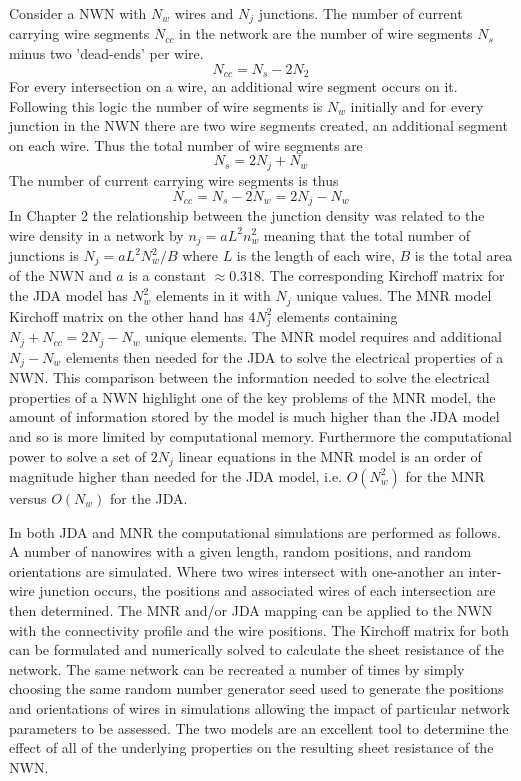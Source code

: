 Consider a NWN with $N_w$ wires and $N_j$ junctions. The number of current carrying wire segments $N_{cc}$ in the network are the number of wire segments $N_s$ minus two 'dead-ends' per wire.
\begin{equation}
N_{cc} = N_s - 2 N_2
\end{equation}
For every intersection on a wire, an additional wire segment occurs on it. Following this logic the number of wire segments is $N_w$ initially and for every junction in the NWN there are two wire segments created, an additional segment on each wire. Thus the total number of wire segments are 
\begin{equation}
N_s = 2N_j + N_w
\end{equation}
The number of current carrying wire segments is thus 
\begin{equation}
N_{cc} = N_s - 2 N_w = 2 N_j - N_w
\end{equation}
In Chapter 2 the relationship between the junction density was related to the wire density in a network by $n_j = a L^2 n_w^2 $ meaning that the total number of junctions is $N_j = a L^2 N_w^2 / B$ where $L$ is the length of each wire, $B$ is the total area of the NWN and $a$ is a constant $\approx 0.318$. The corresponding Kirchoff matrix for the JDA model has $N_w^2$ elements in it with $N_j$ unique values. The MNR model Kirchoff matrix on the other hand has $4 N_j^2$ elements containing $ N_j + N_{cc} = 2 N_j - N_w $ unique elements. The MNR model requires and additional $N_j - N_w$ elements then needed for the JDA to solve the electrical properties of a NWN. This comparison between the information needed to solve the electrical properties of a NWN highlight one of the key problems of the MNR model, the amount of information stored by the model is much higher than the JDA model and so is more limited by computational memory. Furthermore the computational power to solve a set of $2 N_j$ linear equations in the MNR model is an order of magnitude higher than needed for the JDA model, i.e. $O(N_w^2)$ for the MNR versus $O(N_w)$ for the JDA.

In both JDA and MNR the computational simulations are performed as follows. A number of nanowires with a given length, random positions, and random orientations are simulated. Where two wires intersect with one-another an inter-wire junction occurs, the positions and associated wires of each intersection are then determined. The MNR and/or JDA mapping can be applied to the NWN with the connectivity profile and the wire positions. The Kirchoff matrix for both can be formulated and numerically solved to calculate the sheet resistance of the network. The same network can be recreated a number of times by simply choosing the same random number generator seed used to generate the positions and orientations of wires in simulations allowing the impact of particular network parameters to be assessed. The two models are an excellent tool to determine the effect of all of the underlying properties on the resulting sheet resistance of the NWN. 

